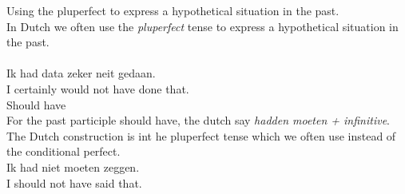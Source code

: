 \documentclass[letterpaper,11pt]{article}
\begin{document}
Using the pluperfect to express a hypothetical situation in the past. \\
In Dutch we often use the \textit{pluperfect} tense to express a hypothetical
situation in the past. \\
  \\
Ik had data zeker neit gedaan. \\
I certainly would not have done that. \\
Should have \\
For the past participle should have, the dutch say \textit{hadden moeten +
infinitive}. The Dutch construction is int he pluperfect tense which we often
use instead of the conditional perfect. \\
Ik had niet moeten zeggen. \\
I should not have said that. \\
\end{document}
